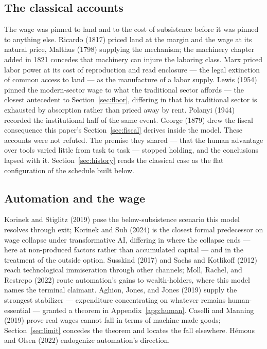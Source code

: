 \documentclass[12pt]{article}
\theoremstyle{plain}
\begin{document}
\subsection{The classical accounts}\label{sec:classical}

The wage was pinned to land and to the cost of subsistence before it was pinned to anything else. Ricardo (1817) priced land at the margin and the wage at its natural price, Malthus (1798) supplying the mechanism; the machinery chapter added in 1821 concedes that machinery can injure the laboring class. Marx priced labor power at its cost of reproduction and read enclosure --- the legal extinction of common access to land --- as the manufacture of a labor supply. Lewis (1954) pinned the modern-sector wage to what the traditional sector affords --- the closest antecedent to Section~\ref{sec:floor}, differing in that his traditional sector is exhausted by absorption rather than priced away by rent. Polanyi (1944) recorded the institutional half of the same event. George (1879) drew the fiscal consequence this paper's Section~\ref{sec:fiscal} derives inside the model. These accounts were not refuted. The premise they shared --- that the human advantage over tools varied little from task to task --- stopped holding, and the conclusions lapsed with it. Section~\ref{sec:history} reads the classical case as the flat configuration of the schedule built below.

\subsection{Automation and the wage}\label{sec:automation}

Korinek and Stiglitz (2019) pose the below-subsistence scenario this model resolves through exit; Korinek and Suh (2024) is the closest formal predecessor on wage collapse under transformative AI, differing in where the collapse ends --- here at non-produced factors rather than accumulated capital --- and in the treatment of the outside option. Susskind (2017) and Sachs and Kotlikoff (2012) reach technological immiseration through other channels; Moll, Rachel, and Restrepo (2022) route automation's gains to wealth-holders, where this model names the terminal claimant. Aghion, Jones, and Jones (2019) supply the strongest stabilizer --- expenditure concentrating on whatever remains human-essential --- granted a theorem in Appendix~\ref{app:human}. Caselli and Manning (2019) prove real wages cannot fall in terms of machine-made goods; Section~\ref{sec:limit} concedes the theorem and locates the fall elsewhere. Hémous and Olsen (2022) endogenize automation's direction.
\end{document}

